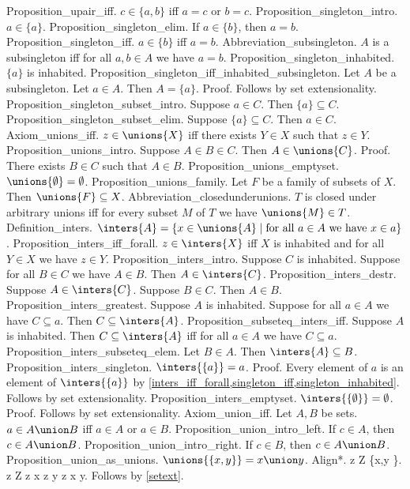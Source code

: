 Proposition_upair_iff. $c \in \{a,b \}$ iff $a = c$ or $b = c$.
Proposition_singleton_intro. $a \in \{a \}$.
Proposition_singleton_elim. If $a \in \{b \}$, then $a = b$.
Proposition_singleton_iff. $a \in \{b \}$ iff $a = b$.
Abbreviation_subsingleton. $A$ is a subsingleton iff for all $a, b \in A$ we have $a = b$.
Proposition_singleton_inhabited. $ \{a \}$ is inhabited.
Proposition_singleton_iff_inhabited_subsingleton. Let $A$ be a subsingleton. Let $a \in A$. Then $A =  \{a \}$.
Proof. Follows by set extensionality.
Proposition_singleton_subset_intro. Suppose $a \in C$. Then $ \{a \} \subseteq C$.
Proposition_singleton_subset_elim. Suppose $ \{a \} \subseteq C$. Then $a \in C$.
Axiom_unions_iff. $z \in \unions{X}$ iff there exists $Y \in X$ such that $z \in Y$.
Proposition_unions_intro. Suppose $A \in B \in C$. Then $A \in \unions{C}$.
Proof. There exists $B \in C$ such that $A \in B$.
Proposition_unions_emptyset. $ \unions{ \emptyset} =  \emptyset$.
Proposition_unions_family. Let $F$ be a family of subsets of $X$. Then $ \unions{F} \subseteq X$.
Abbreviation_closedunderunions. $T$ is closed under arbitrary unions iff for every subset $M$ of $T$ we have $ \unions{M} \in T$.
Definition_inters. $ \inters{A} =  \{ x \in \unions{A} \mid  \text{for all $a \in A$ we have $x \in a$}  \}$.
Proposition_inters_iff_forall. $z \in \inters{X}$ iff $X$ is inhabited and for all $Y \in X$ we have $z \in Y$.
Proposition_inters_intro. Suppose $C$ is inhabited. Suppose for all $B \in C$ we have $A \in B$. Then $A \in \inters{C}$.
Proposition_inters_destr. Suppose $A \in \inters{C}$. Suppose $B \in C$. Then $A \in B$.
Proposition_inters_greatest. Suppose $A$ is inhabited. Suppose for all $a \in A$ we have $C \subseteq a$. Then $C \subseteq \inters{A}$.
Proposition_subseteq_inters_iff. Suppose $A$ is inhabited. Then $C \subseteq \inters{A}$ iff for all $a \in A$ we have $C \subseteq a$.
Proposition_inters_subseteq_elem. Let $B \in A$. Then $ \inters{A} \subseteq B$.
Proposition_inters_singleton. $ \inters{ \{a \}} = a$.
Proof. Every element of $a$ is an element of $ \inters{ \{a \}}$ by  \cref{inters_iff_forall,singleton_iff,singleton_inhabited}. Follows by set extensionality.
Proposition_inters_emptyset. $ \inters{ \{ \emptyset \}} =  \emptyset$.
Proof. Follows by set extensionality.
Axiom_union_iff. Let $A, B$ be sets. $a \in A \union B$ iff $a \in A$ or $a \in B$.
Proposition_union_intro_left. If $c \in A$, then $c \in A \union B$.
Proposition_union_intro_right. If $c \in B$, then $c \in A \union B$.
Proposition_union_as_unions. $ \unions{ \{x,y \}} = x \union y$.
Align*. z \in  {}  \iff  \exists Z \in \{x,y \}. z \in Z  \iff z \in x  \lor z \in y  \iff z \in x \union y. Follows by  \cref{setext}. %
